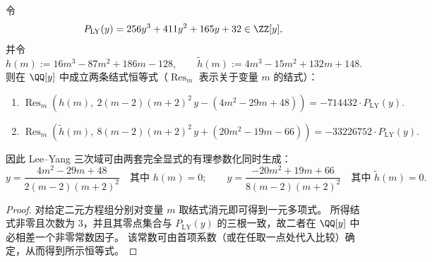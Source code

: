 \begin{theorem}\label{thm:xi-leyang-ed-tschirnhaus-resultants-lock-PLY}
令
\[
P_{\mathrm{LY}}(y)=256y^3+411y^2+165y+32\in\ZZ[y],
\]
并令
\[
h(m):=16m^3-87m^2+186m-128,\qquad
\tilde h(m):=4m^3-15m^2+132m+148.
\]
则在 \(\QQ[y]\) 中成立两条结式恒等式（\(\operatorname{Res}_m\) 表示关于变量 \(m\) 的结式）：
\begin{enumerate}
  \item
  \[
  \operatorname{Res}_m\!\left(
  h(m),\ 2(m-2)(m+2)^2\,y-(4m^2-29m+48)
  \right)
  =-714432\cdot P_{\mathrm{LY}}(y).
  \]
  \item
  \[
  \operatorname{Res}_m\!\left(
  \tilde h(m),\ 8(m-2)(m+2)^2\,y+(20m^2-19m-66)
  \right)
  =-33226752\cdot P_{\mathrm{LY}}(y).
  \]
\end{enumerate}
因此 Lee--Yang 三次域可由两套完全显式的有理参数化同时生成：
\[
y=\frac{4m^2-29m+48}{2(m-2)(m+2)^2}\quad\text{其中 }h(m)=0;
\qquad
y=\frac{-20m^2+19m+66}{8(m-2)(m+2)^2}\quad\text{其中 }\tilde h(m)=0.
\]
\end{theorem}
\begin{proof}
对给定二元方程组分别对变量 \(m\) 取结式消元即可得到一元多项式。
所得结式非零且次数为 \(3\)，并且其零点集合与 \(P_{\mathrm{LY}}(y)\) 的三根一致，故二者在 \(\QQ[y]\) 中必相差一个非零常数因子。
该常数可由首项系数（或在任取一点处代入比较）确定，从而得到所示恒等式。
\end{proof}

